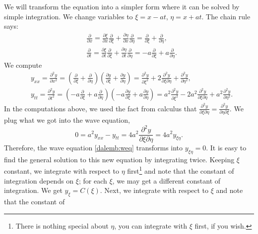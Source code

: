 We will transform the equation into a simpler form where it can be solved by
simple integration.
We change variables to $\xi = x - at$, $\eta = x + at$.
The chain rule says:
\begin{align*}
& \frac{\partial}{\partial x}
=
\frac{\partial \xi}{\partial x}
\frac{\partial}{\partial \xi}
+
\frac{\partial \eta}{\partial x}
\frac{\partial}{\partial \eta}
=
\frac{\partial}{\partial \xi}
+
\frac{\partial}{\partial \eta} , \\
& \frac{\partial}{\partial t}
=
\frac{\partial \xi}{\partial t}
\frac{\partial}{\partial \xi}
+
\frac{\partial \eta}{\partial t}
\frac{\partial}{\partial \eta}
=
-a
\frac{\partial}{\partial \xi}
+
a
\frac{\partial}{\partial \eta} .
\end{align*}
We compute
\begin{align*}
& y_{xx} = \frac{\partial^2 y}{\partial x^2}
=
\left(
\frac{\partial}{\partial \xi}
+
\frac{\partial}{\partial \eta}
\right)
\left(
\frac{\partial y}{\partial \xi}
+
\frac{\partial y}{\partial \eta}
\right)
=
\frac{\partial^2 y}{\partial \xi^2}
+
2 \frac{\partial^2 y}{\partial \xi \partial \eta}
+
\frac{\partial^2 y}{\partial \eta^2} ,
\\
& y_{tt} = \frac{\partial^2 y}{\partial t^2}
=
\left(
-a
\frac{\partial}{\partial \xi}
+ a
\frac{\partial}{\partial \eta}
\right)
\left(
-a
\frac{\partial y}{\partial \xi}
+
a
\frac{\partial y}{\partial \eta}
\right)
=
a^2
\frac{\partial^2 y}{\partial \xi^2}
-
2 a^2 \frac{\partial^2 y}{\partial \xi \partial \eta}
+
a^2
\frac{\partial^2 y}{\partial \eta^2} .
\end{align*}
In the computations above, we used the fact from calculus that
$\frac{\partial^2 y}{\partial \xi \partial \eta} = 
\frac{\partial^2 y}{\partial \eta \partial \xi}$.
We plug what we got into the wave equation,
\begin{equation*}
0 = a^2 y_{xx} - y_{tt} =
4 a^2 \frac{\partial^2 y}{\partial \xi \partial \eta} = 4 a^2 y_{\xi\eta} .
\end{equation*}
Therefore, the wave equation \eqref{dalemb:weq} transforms into
$y_{\xi\eta} = 0$.
It is easy to find the general solution to this new equation by integrating
twice.  Keeping $\xi$ constant, we integrate with respect to $\eta$
first\footnote{There is nothing special about $\eta$, you can integrate with
$\xi$ first, if you wish.}
and note that
the constant of integration depends on $\xi$; for each $\xi$, we may get a
different constant of integration.  We get
$y_{\xi} = C(\xi)$.
Next, we integrate with respect to $\xi$ and note that the constant of
